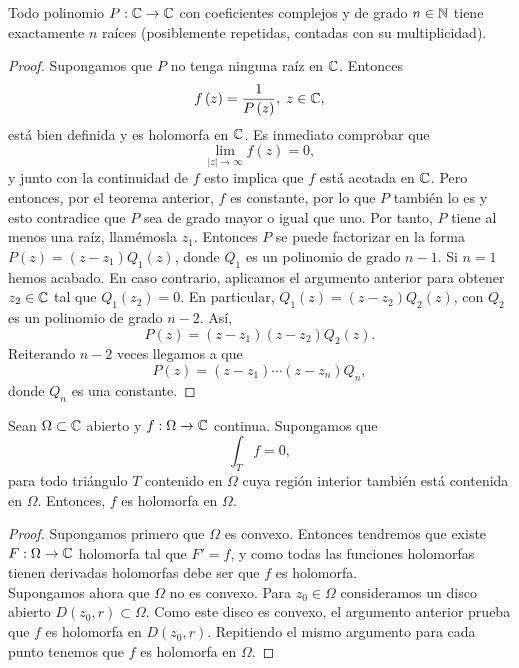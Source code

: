 \begin{colorary}
Todo polinomio $\displaystyle P : \mathbb{C} \to \mathbb{C}  $ con coeficientes complejos y de grado $\displaystyle n \in \mathbb{N} $ tiene exactamente $\displaystyle n $ raíces (posiblemente repetidas, contadas con su multiplicidad).
\end{colorary}
\begin{proof}
Supongamos que $\displaystyle P $ no tenga ninguna raíz en $\displaystyle \mathbb{C} $. Entonces
\[f\left(z\right)=\frac{1}{P\left(z\right)}, \; z \in \mathbb{C} ,\]
está bien definida y es holomorfa en $\displaystyle \mathbb{C} $. Es inmediato comprobar que 
\[\lim_{ \left|z\right| \to \infty }f\left(z\right)=0, \]
y junto con la continuidad de $\displaystyle f $ esto implica que $\displaystyle f $ está acotada en $\displaystyle \mathbb{C} $. Pero entonces, por el teorema anterior, $\displaystyle f $ es constante, por lo que $\displaystyle P $ también lo es y esto contradice que $\displaystyle P $ sea de grado mayor o igual que uno. 
Por tanto, $\displaystyle P $ tiene al menos una raíz, llamémosla $\displaystyle z_{1} $. Entonces $\displaystyle P $ se puede factorizar en la forma $\displaystyle P\left(z\right)=\left(z-z_{1}\right)Q_{1}\left(z\right) $, donde $\displaystyle Q_{1} $ es un polinomio de grado $\displaystyle n-1 $. 
Si $\displaystyle n = 1 $ hemos acabado. En caso contrario, aplicamos el argumento anterior para obtener $\displaystyle z_{2}\in \mathbb{C} $ tal que $\displaystyle Q_{1}\left(z_{2}\right)=0 $. En particular, $\displaystyle Q_{1}\left(z\right)=\left(z-z_{2}\right)Q_{2}\left(z\right) $, con $\displaystyle Q_{2} $ es un polinomio de grado $\displaystyle n-2 $. Así,
\[P\left(z\right)=\left(z-z_{1}\right)\left(z-z_{2}\right)Q_{2}\left(z\right) .\]
Reiterando $\displaystyle n-2 $ veces llegamos a que
\[P\left(z\right)=\left(z-z_{1}\right) \cdots \left(z-z_{n}\right)Q_{n} ,\]
donde $\displaystyle Q_{n} $ es una constante. 
\end{proof}
\begin{theorem}
Sean $\displaystyle \Omega\subset\mathbb{C} $ abierto y $\displaystyle f : \Omega \to \mathbb{C} $ continua. Supongamos que 
\[\int _{T}f =0 ,\]
para todo triángulo $\displaystyle T $ contenido en $\displaystyle \Omega  $ cuya región interior también está contenida en $\displaystyle \Omega  $. Entonces, $\displaystyle f $ es holomorfa en $\displaystyle \Omega  $.
\end{theorem}
\begin{proof}
Supongamos primero que $\displaystyle \Omega  $ es convexo. Entonces tendremos que existe $\displaystyle F : \Omega \to \mathbb{C} $ holomorfa tal que $\displaystyle F' = f $, y como todas las funciones holomorfas tienen derivadas holomorfas debe ser que $\displaystyle f $ es holomorfa. \\
\indent Supongamos ahora que $\displaystyle \Omega  $ no es convexo. Para $\displaystyle z_{0}\in \Omega  $ consideramos un disco abierto $\displaystyle D\left(z_{0}, r\right)\subset \Omega  $. Como este disco es convexo, el argumento anterior prueba que $\displaystyle f $ es holomorfa en $\displaystyle D\left(z_{0}, r\right) $. Repitiendo el mismo argumento para cada punto tenemos que $\displaystyle f $ es holomorfa en $\displaystyle \Omega  $. 
\end{proof}
